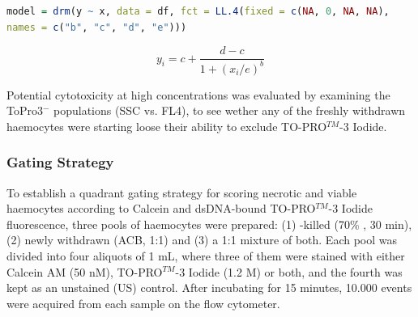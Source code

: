 \begin{lstlisting}[language=R, caption = {The R source code run to fit the four-parameter log-logistic regression model in RStudio.}]
model = drm(y ~ x, data = df, fct = LL.4(fixed = c(NA, 0, NA, NA), 
names = c("b", "c", "d", "e")))
\end{lstlisting}

\begin{equation}
\label{eq:LL4}
y_{i} = c + \dfrac{d-c}{1 + (x_i / e)^b}
\end{equation}

Potential cytotoxicity at high concentrations was evaluated by examining the ToPro3$^{-}$ populations (SSC vs. FL4), to see wether any of the freshly withdrawn haemocytes were starting loose their ability to exclude TO-PRO$^{TM}$-3 Iodide.

\subsubsection{Gating Strategy}
\label{subsubsection: gating validation}
To establish a quadrant gating strategy for scoring necrotic and viable haemocytes according to Calcein and dsDNA-bound TO-PRO$^{TM}$-3 Iodide fluorescence, three pools of haemocytes were prepared: (1) -killed (70\% , 30 min), (2) newly withdrawn (ACB, 1:1) and (3) a 1:1 mixture of both. Each pool was divided into four aliquots of 1 mL, where three of them were stained with either Calcein AM (50 nM), TO-PRO$^{TM}$-3 Iodide (1.2 \micro M) or both, and the fourth was kept as an unstained (US) control. After incubating for 15 minutes, 10.000 events were acquired from each sample on the flow cytometer.


